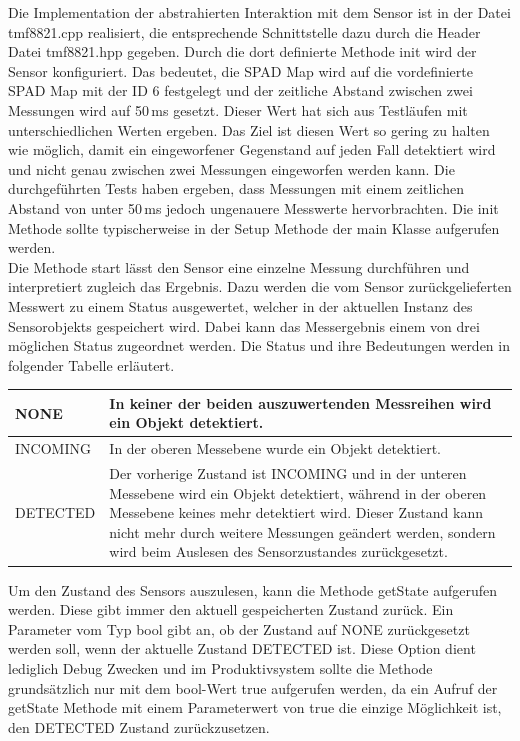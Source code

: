         Die Implementation der abstrahierten Interaktion mit dem Sensor ist in der Datei tmf8821.cpp realisiert, die entsprechende Schnittstelle dazu durch die Header Datei tmf8821.hpp gegeben. Durch die dort definierte Methode init wird der Sensor konfiguriert. Das bedeutet, die SPAD Map wird auf die vordefinierte SPAD Map mit der ID 6 festgelegt und der zeitliche Abstand zwischen zwei Messungen wird auf 50\,ms gesetzt. Dieser Wert hat sich aus Testläufen mit unterschiedlichen Werten ergeben. Das Ziel ist diesen Wert so gering zu halten wie möglich, damit ein eingeworfener Gegenstand auf jeden Fall detektiert wird und nicht genau zwischen zwei Messungen eingeworfen werden kann. Die durchgeführten Tests haben ergeben, dass Messungen mit einem zeitlichen Abstand von unter 50\,ms jedoch ungenauere Messwerte hervorbrachten. Die init Methode sollte typischerweise in der Setup Methode der main Klasse aufgerufen werden.\\

        Die Methode start lässt den Sensor eine einzelne Messung durchführen und interpretiert zugleich das Ergebnis. Dazu werden die vom Sensor zurückgelieferten Messwert zu einem Status ausgewertet, welcher in der aktuellen Instanz des Sensorobjekts gespeichert wird. Dabei kann das Messergebnis einem von drei möglichen Status zugeordnet werden. Die Status und ihre Bedeutungen werden in folgender Tabelle erläutert.

        \begin{table}[H]
            \centering
            \begin{tabularx}{\textwidth}{ |l|X| } 
                \hline
                NONE & In keiner der beiden auszuwertenden Messreihen wird ein Objekt detektiert.\\
                \hline
                INCOMING & In der oberen Messebene wurde ein Objekt detektiert. \\
                \hline
                DETECTED & Der vorherige Zustand ist INCOMING und in der unteren Messebene wird ein Objekt detektiert, während in der oberen Messebene keines mehr detektiert wird. Dieser Zustand kann nicht mehr durch weitere Messungen geändert werden, sondern wird beim Auslesen des Sensorzustandes zurückgesetzt.\\
                \hline
            \end{tabularx}
        \end{table}

        Um den Zustand des Sensors auszulesen, kann die Methode getState aufgerufen werden. Diese gibt immer den aktuell gespeicherten Zustand zurück. Ein Parameter vom Typ bool gibt an, ob der Zustand auf NONE zurückgesetzt werden soll, wenn der aktuelle Zustand DETECTED ist. Diese Option dient lediglich Debug Zwecken und im Produktivsystem sollte die Methode grundsätzlich nur mit dem bool-Wert true aufgerufen werden, da ein Aufruf der getState Methode mit einem Parameterwert von true die einzige Möglichkeit ist, den DETECTED Zustand zurückzusetzen.\\
        

